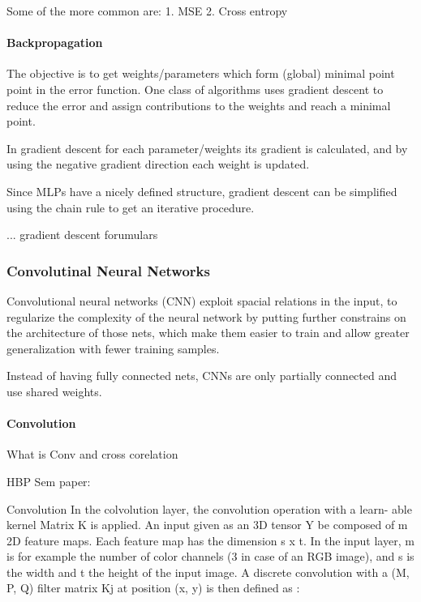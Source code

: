 Some of the more common are:
1. MSE
2. Cross entropy

\paragraph{Backpropagation}

The objective is to get weights/parameters which form (global) minimal point point in the error function. 
One class of algorithms uses gradient descent to reduce the error and assign contributions to the weights and reach a minimal point.

In gradient descent for each parameter/weights its gradient is calculated, and by using the negative gradient direction each weight is updated.

Since MLPs have a nicely defined structure, gradient descent can be simplified using the chain rule to get an iterative procedure.
 
... gradient descent forumulars

\subsubsection{Convolutinal Neural Networks}

Convolutional neural networks (CNN) exploit spacial relations in the input, to regularize the complexity of the neural network by putting further constrains on the architecture of those nets, which make them easier to train and allow greater generalization with fewer training samples.


Instead of having fully connected nets, CNNs are only partially connected and use shared weights.    

\paragraph{Convolution}

What is Conv and cross corelation

HBP Sem paper:

Convolution In the colvolution layer, the convolution operation with a learn-
able kernel Matrix K is applied. An input given as an 3D tensor Y be composed
of m 2D feature maps. Each feature map has the dimension s x t. In the input
layer, m is for example the number of color channels (3 in case of an RGB image),
and s is the width and t the height of the input image. A discrete convolution
with a (M, P, Q) filter matrix Kj at position (x, y) is then defined as :


